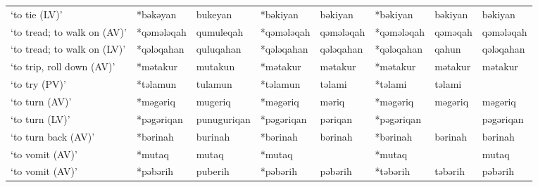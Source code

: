 \begin{landscape}
\begin{longtable}[c]{@{}p{3cm}<{\raggedright}p{2.75cm}<{\raggedright}p{2.75cm}<{\raggedright}p{2.75cm}<{\raggedright}p{2.75cm}<{\raggedright}p{2.75cm}<{\raggedright}p{2.75cm}<{\raggedright}p{2.75cm}<{\raggedright}@{}}
`to tie (LV)'                                        & *bəkəyan           & bukeyan                        & *bəkiyan           & bəkiyan                    & *bəkiyan         & bəkiyan                  & bəkiyan                           \\
`to tread; to walk on (AV)'                          & *qəmələqah         & qumuleqah                      & *qəmələqah         & qəmələqah                  & *qəmələqah       & qəməqah                  & qəmələqah                         \\
`to tread; to walk on (LV)'                          & *qələqahan         & quluqahan                      & *qələqahan         & qələqahan                  & *qələqahan       & qahun                    & qələqahan                         \\
`to trip, roll down (AV)'                            & *mətakur           & mutakun                        & *mətakur           & mətakur                    & *mətakur         & mətakur                  & mətakur                           \\
`to try (PV)'                                        & *təlamun           & tulamun                        & *təlamun           & təlami                     & *təlami          & təlami                   &                                   \\
`to turn (AV)'                                       & *məgəriq           & mugeriq                        & *məgəriq           & məriq                      & *məgəriq         & məgəriq                  & məgəriq                           \\
`to turn (LV)'                                       & *pəgəriqan         & punuguriqan                    & *pəgəriqan         & pəriqan                    & *pəgəriqan       &                          & pəgəriqan                         \\
`to turn back (AV)'                                  & *bərinah           & burinah                        & *bərinah           & bərinah                    & *bərinah         & bərinah                  & bərinah                           \\
`to vomit (AV)'                                      & *mutaq             & mutaq                          & *mutaq             &                            & *mutaq           &                          & mutaq                             \\
`to vomit (AV)'                                      & *pəbərih           & puberih                        & *pəbərih           & pəbərih                    & *təbərih         & təbərih                  & pəbərih                           \\

\end{longtable}
\end{landscape}
